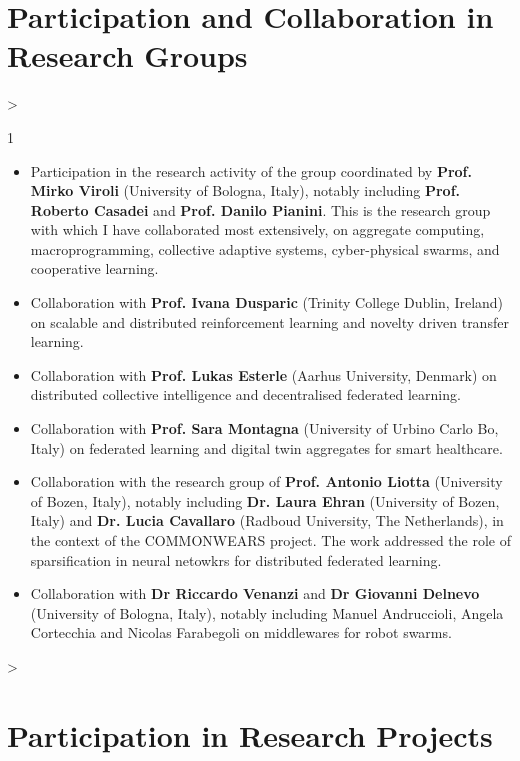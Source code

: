 \documentclass[10pt,a4paper,roman]{moderncv}        %
\makeatletter
\newenvironment{cvprose}%
  {\begin{list}{}{%
     \setlength{\leftmargin}{\dimexpr\hintscolumnwidth+\separatorcolumnwidth\relax}%
     \setlength{\rightmargin}{0pt}%
     \setlength{\listparindent}{0pt}%
     \setlength{\itemindent}{0pt}%
     \setlength{\labelwidth}{0pt}%
     \setlength{\topsep}{.25em}%
     \setlength{\parsep}{.5em}%
     \setlength{\partopsep}{0pt}}%
   \item\relax}%
  {\end{list}}
\newenvironment{cvlist}[1][2]%
  {\begin{cvprose}%
   \cvlist@cols=#1\relax
   \setlength{\multicolsep}{0pt}%
   \setlength{\columnsep}{1.2em}%
   \setlength{\columnwidth}{\linewidth}%
   \ifnum\cvlist@cols>\@ne\begin{multicols}{#1}\fi
   \begin{itemize}%
     \setlength{\itemsep}{.1ex}%
     \setlength{\parskip}{0pt}%
     \setlength{\topsep}{0pt}}%
  {\end{itemize}%
   \ifnum\cvlist@cols>\@ne\end{multicols}\fi
   \end{cvprose}}
\newcommand{\cvsection}[1]{\Needspace{6\baselineskip}\section{#1}}
\makeatother
\begin{document}
\cvsection{Participation and Collaboration in Research Groups}
\begin{cvlist}[1]
  \item Participation in the research activity of the group coordinated by \textbf{Prof. Mirko Viroli} (University of Bologna, Italy), notably including \textbf{Prof. Roberto Casadei} and \textbf{Prof. Danilo Pianini}. This is the research group with which I have collaborated most extensively, on aggregate computing, macroprogramming, collective adaptive systems, cyber-physical swarms, and cooperative learning.
  \item Collaboration with \textbf{Prof. Ivana Dusparic} (Trinity College Dublin, Ireland) on scalable and distributed reinforcement learning and novelty driven transfer learning.
  \item Collaboration with \textbf{Prof. Lukas Esterle} (Aarhus University, Denmark) on distributed collective intelligence and decentralised federated learning. 
  \item Collaboration with \textbf{Prof. Sara Montagna} (University of Urbino Carlo Bo, Italy) on federated learning and digital twin aggregates for smart healthcare.
  \item Collaboration with the research group of \textbf{Prof. Antonio Liotta} (University of Bozen, Italy), notably including \textbf{Dr. Laura Ehran} (University of Bozen, Italy) and \textbf{Dr. Lucia Cavallaro} (Radboud University, The Netherlands), in the context of the COMMONWEARS project. The work addressed the role of sparsification in neural netowkrs for distributed federated learning.
  \item Collaboration with \textbf{Dr Riccardo Venanzi} and \textbf{Dr Giovanni Delnevo} (University of Bologna, Italy), notably including Manuel Andruccioli, Angela Cortecchia and Nicolas Farabegoli on middlewares for robot swarms.
\end{cvlist}


\cvsection{Participation in Research Projects}  
\end{document}
